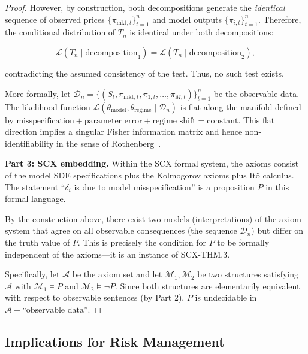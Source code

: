\documentclass[11pt,a4paper]{article}
\theoremstyle{plain}
\theoremstyle{definition}
\theoremstyle{remark}
\newcommand{\SCX}{\textsc{SCX}}
\begin{document}
\begin{proof}
However, by construction, both decompositions generate the \emph{identical} sequence of observed prices $\{\pi_{\text{mkt}, t}\}_{t=1}^n$ and model outputs $\{\pi_{i,t}\}_{t=1}^n$. Therefore, the conditional distribution of $T_n$ is identical under both decompositions:

\begin{equation}\label{eq:identical_dist}
  \mathcal{L}(T_n \mid \text{decomposition}_1) = \mathcal{L}(T_n \mid \text{decomposition}_2),
\end{equation}

contradicting the assumed consistency of the test. Thus, no such test exists.

More formally, let $\mathcal{D}_n = \{ (S_t, \pi_{\text{mkt}, t}, \pi_{1,t}, \dots, \pi_{M,t}) \}_{t=1}^n$ be the observable data. The likelihood function $\mathcal{L}(\theta_{\text{model}}, \theta_{\text{regime}} \mid \mathcal{D}_n)$ is flat along the manifold defined by $\text{misspecification} + \text{parameter error} + \text{regime shift} = \text{constant}$. This flat direction implies a singular Fisher information matrix and hence non-identifiability in the sense of Rothenberg~\citep{rothenberg1971identification}.

\medskip\noindent\textbf{Part 3: \SCX{} embedding.}
Within the \SCX{} formal system, the axioms consist of the model SDE specifications plus the Kolmogorov axioms plus It\^o calculus. The statement ``$\delta_i$ is due to model misspecification'' is a proposition $P$ in this formal language.

By the construction above, there exist two models (interpretations) of the axiom system that agree on all observable consequences (the sequence $\mathcal{D}_n$) but differ on the truth value of $P$. This is precisely the condition for $P$ to be formally independent of the axioms---it is an instance of \textsc{SCX-THM.3}.

Specifically, let $\mathcal{A}$ be the axiom set and let $\mathcal{M}_1, \mathcal{M}_2$ be two structures satisfying $\mathcal{A}$ with $\mathcal{M}_1 \models P$ and $\mathcal{M}_2 \models \neg P$. Since both structures are elementarily equivalent with respect to observable sentences (by Part 2), $P$ is undecidable in $\mathcal{A} + \text{``observable data''}$.
\end{proof}

\subsection{Implications for Risk Management}
\end{document}
